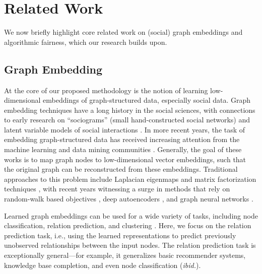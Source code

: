\section{Related Work}
We now briefly highlight core related work on (social) graph embeddings and algorithmic fairness, which our research builds upon.

\subsection{Graph Embedding}
At the core of our proposed methodology is the notion of learning low-dimensional embeddings of graph-structured data, especially social data.
Graph embedding techniques have a long history in the social sciences, with connections to early research on ``sociograms'' (small hand-constructed social networks) and latent variable models of social interactions \cite{faust1988comparison,majone1972social}.
In more recent years, the task of embedding graph-structured data has received increasing attention from the machine learning and data mining communities \cite{cai2018comprehensive,hamilton2017representation}. 
Generally, the goal of these works is to map graph nodes to low-dimensional vector embeddings, such that the original graph can be reconstructed from these embeddings.
Traditional approaches to this problem include Laplacian eigenmaps \cite{belkin2002laplacian} and matrix factorization techniques \cite{ng2001spectral}, with recent years witnessing a surge in methods that rely on random-walk based objectives \cite{grover2016node2vec,perozzi2014deepwalk}, deep autoencoders \cite{wang2016structural}, and graph neural networks \cite{hamilton2017inductive,kipf2016variational}. 

Learned graph embeddings can be used for a wide variety of tasks, including node classification, relation prediction, and clustering \cite{hamilton2017representation}.
Here, we focus on the relation prediction task, i.e., using the learned representations to predict previously unobserved relationships between the input nodes.
The relation prediction task is exceptionally general---for example, it generalizes basic recommender systems, knowledge base completion, and even node classification (\textit{ibid.}).%

